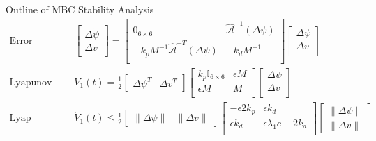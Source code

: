 \begin{frame}[t]{Outline of MBC Stability Analysis}
\begin{align}
\text{Error Dynamics:}\quad &\left[ \begin{array}{c}
     \Delta \dot{\psi}           \\
     \Delta \dot{v}              \\
\end{array} \right]=
\left[ \begin{array}{cc}
     0_{6\times 6}   & \hat{\mathcal{A}}^{-1}(\Delta \psi)             \\
     -k_p M^{-1}\hat{\mathcal{A}}^{-T}(\Delta \psi)   &  -k_d M^{-1}   \\
\end{array} \right]\left[ \begin{array}{c}
     \Delta \psi           \\
     \Delta v              \\
\end{array} \right]
\nonumber \\
\text{Lyapunov Fn:}\quad & 
V_1(t)=\frac{1}{2} \left[\begin{array}{cc}
   \Delta \psi^T & \Delta v^T
   \end{array} \right]
\left[ 
\begin{array}{cc}
  k_p\mathbb{I}_{6\times 6}  & \epsilon M         \\
  \epsilon M               &    M               \\
\end{array} \right]\left[ \begin{array}{c}
     \Delta \psi           \\
     \Delta v              \\
\end{array} \right]
\nonumber \\
\text{Lyap Derivative:}\quad & \dot{V}_1(t) \leq\frac{1}{2}\left[\begin{array}{cc}
   \|\Delta \psi\| & \|\Delta v\|
   \end{array} \right] 
  \left[\begin{array}{cc}
  -\epsilon 2 k_p  & \epsilon k_d    \\
 \epsilon k_d      &   \epsilon \lambda_1 c- 2k_d\\
  \end{array} \right] 
\left[\begin{array}{c}
   \|\Delta \psi\| \\ \|\Delta v\|
\end{array} \right] 
\nonumber
\end{align}


\end{frame}
